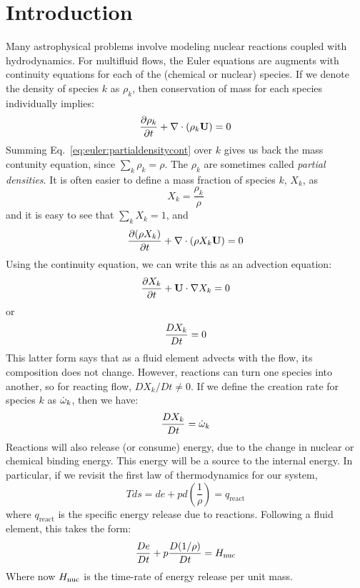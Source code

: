 
\section{Introduction}

Many astrophysical problems involve modeling nuclear reactions coupled
with hydrodynamics.  For multifluid flows, the Euler equations are
augments with continuity equations for each of the (chemical or
nuclear) species.  If we denote the density of species $k$ as
$\rho_k$, then conservation of mass for each species individually
implies:
\begin{equation}
\label{eq:euler:partialdensitycont}
{\frac{{\partial\rho_k}}{\partial t}} + \nabla \cdot (\rho_k {\bf U}) = 0
\end{equation}
Summing Eq.~\ref{eq:euler:partialdensitycont} over $k$ gives us back
the mass contunity equation, since $\sum_k \rho_k = \rho$.  The
$\rho_k$ are sometimes called {\em partial densities}.  It is often
easier to define a mass fraction of species $k$, $X_k$, as
\begin{equation}
X_k = \frac{\rho_k}{\rho}
\end{equation}
and it is easy to see that $\sum_k X_k = 1$, and 
\begin{equation}
\frac{\partial (\rho X_k)}{\partial t} + \nabla \cdot  (\rho X_k {\bf U}) = 0
\end{equation}
Using the continuity equation, we can write this as an advection
equation:
\begin{equation}
\frac{\partial X_k}{\partial t} + {\bf U} \cdot \nabla X_k = 0
\end{equation}
or 
\begin{equation}
{\frac{{DX_k}}{D t}} = 0
\end{equation}
This latter form says that as a fluid element advects with the flow,
its composition does not change.  However, reactions can turn one
species into another, so for reacting flow, $DX_k/Dt \ne 0$.  If we
define the creation rate for species $k$ as ${\dot{\omega}}_k$, then we have:
\begin{equation}
{\frac{{DX_k}}{D t}} = {\dot{\omega}}_k
\end{equation}
Reactions will also release (or consume) energy, due to the change in
nuclear or chemical binding energy.  This energy will be a source to
the internal energy.  In particular, if we revisit the first law of
thermodynamics for our system,
\begin{equation}
T ds = de + p d \left( \frac{1}{\rho}\right ) = q_\mathrm{react}
\end{equation}
where $q_\mathrm{react}$ is the specific energy release due to
reactions.  Following a fluid element, this takes the form:
\begin{equation}
{\frac{{De}}{D t}} + p {\frac{{D(1/\rho)}}{D t}} = {H_\mathrm{nuc}}
\end{equation}
Where now ${H_\mathrm{nuc}}$ is the time-rate of energy release per unit mass.

